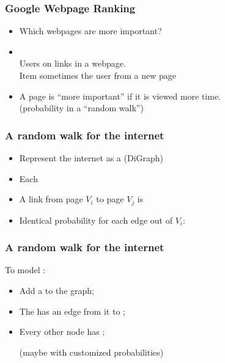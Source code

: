 \documentclass{beamer}
\begin{document}
\begin{frame}
  \frametitle{Google Webpage Ranking}

  {\larger

    \begin{itemize}
    \item Which webpages are more important?
      \bigskip

    \item {}\\
      Users  on links in a webpage.\\
      Item sometimes the user  from a new page
      \bigskip

    \item A page is ``more important'' if it is viewed more time.\\
      \hfill (probability in a ``random walk'')
    \end{itemize}    
  }
\end{frame}

\begin{frame}
  \frametitle{A random walk for the internet}

  {\larger
    \begin{itemize}
    \item Represent the internet as a  (DiGraph)
      \bigskip
      
    \item Each 
    \item A link from page $V_i$ to page $V_j$ is 
      \bigskip

    \item Identical probability for each edge out of $V_i$:
    \end{itemize}
  }
\end{frame}

\begin{frame}
  \frametitle{A random walk for the internet}

  {\larger
    To model :
    \vfill
    
    \begin{itemize}
    \item Add a  to the graph;
      \bigskip
      
    \item The  has an edge from it to
      ;
      \bigskip
      
    \item Every other node has ;\\
      \bigskip
      
      \hfill (maybe with customized probabilities)
    \end{itemize}
  }
\end{frame}
\end{document}
